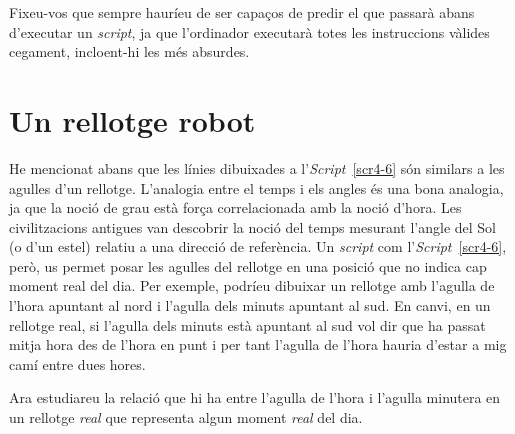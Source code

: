 Fixeu-vos que sempre hauríeu de ser capaços de predir el que passarà abans d'executar un \emph{script}, ja que l'ordinador executarà totes les instruccions vàlides cegament, incloent-hi les més absurdes. 

\section{Un rellotge robot}
He mencionat abans que les línies dibuixades a l'\emph{Script}~\ref{scr4-6} són similars a les agulles d'un rellotge. L'analogia entre el temps i els angles és una bona analogia, ja que la noció de grau està força correlacionada amb la noció d'hora. Les civilitzacions antigues van descobrir la noció del temps mesurant l'angle del Sol (o d'un estel) relatiu a una direcció de referència. Un \emph{script} com l'\emph{Script}~\ref{scr4-6}, però, us permet posar les agulles del rellotge en una posició que no indica cap moment real del dia. Per exemple, podríeu dibuixar un rellotge amb l'agulla de l'hora apuntant al nord i l'agulla dels minuts apuntant al sud. En canvi, en un rellotge real, si l'agulla dels minuts està apuntant al sud vol dir que ha passat mitja hora des de l'hora en punt i per tant l'agulla de l'hora hauria d'estar a mig camí entre dues hores. 

Ara estudiareu la relació que hi ha entre l'agulla de l'hora i l'agulla minutera en un rellotge \emph{real} que representa algun moment \emph{real} del dia.

\newpage

